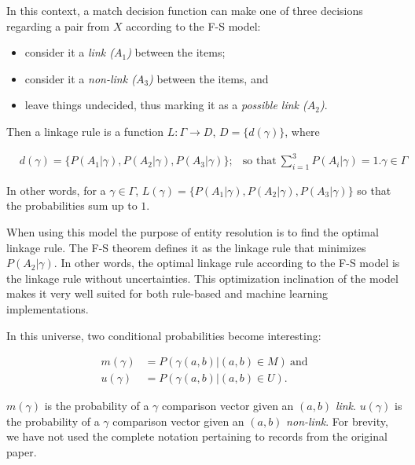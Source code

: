 \documentclass[11pt]{article}
\begin{document}
    In this context, a match decision function can make one of three decisions
    regarding a pair from $X$ according to the F-S model:
    
    \begin{itemize}
        \item consider it a \textit{link ($A_1$)} between the items;
        \item consider it a \textit{non-link ($A_3$)} between the items, and
        \item leave things undecided, thus marking it as a \textit{possible link
              ($A_2$)}.
    \end{itemize}
    
    Then a linkage rule is a function $L:\varGamma \rightarrow D$,
    $D=\{d(\gamma)\}$, where
    
    \begin{align}
        &d(\gamma) = \{P(A_1|\gamma),P(A_2|\gamma),P(A_3|\gamma)\};
        &\textrm{so that}~\sum_{i=1}^{3}P(A_i|\gamma) = 1\nonumber.
        \gamma \in \varGamma\nonumber
    \end{align}

    In other words, for a $\gamma \in \varGamma$, $L(\gamma) = \{P(A_1|\gamma),
    P(A_2|\gamma), P(A_3|\gamma)\}$ so that the probabilities sum up to $1$.

    When using this model the purpose of entity resolution is to find the
    optimal linkage rule.
    The F-S theorem defines it as the linkage rule that minimizes
    $P(A_2|\gamma)$.
    In other words, the optimal linkage rule according to the F-S model is the
    linkage rule without uncertainties.
    This optimization inclination of the model makes it very well suited for
    both rule-based\cite{oyster2012} and machine learning\cite{deepm2020}
    implementations.
    
    In this universe, two conditional probabilities become interesting:

    \begin{align}
        m(\gamma)&=P(\gamma(a, b) | (a, b) \in M)~\textrm{and}\nonumber\\
        u(\gamma)&=P(\gamma(a, b) | (a, b) \in U)\textrm{.}\nonumber
    \end{align}

    \noindent
    $m(\gamma)$ is the probability of a $\gamma$ comparison vector given an
    $(a, b)$ \textit{link}.
    $u(\gamma)$ is the probability of a $\gamma$ comparison vector given an
    $(a, b)$ \textit{non-link}.
    For brevity, we have not used the complete notation pertaining to records
    from the original paper.
\end{document}
